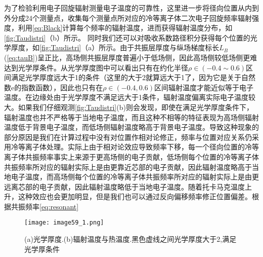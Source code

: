 为了检验利用电子回旋辐射测量电子温度的可靠性，这里进一步将径向位置从内到外分成24个测量点，收集每个测量点所对应的冷等离子体二次电子回旋频率辐射强度，利用\autoref{eq:Black}计算每个频率的辐射温度，进而获得辐射温度分布，如\autoref{fig:Taudistri}（b）所示。
同时我们还可以对吸收系数路径积分获得每个位置的光学厚度，如\autoref{fig:Taudistri}（a）所示。由于共振层厚度与纵场梯度标长$L_B$(\autoref{eq:tauB})呈正比，高场侧共振层厚度普遍小于低场侧，因此高场侧较低场侧更难达到光学厚条件。从光学厚度图中可以看出只有在约化半径$ρ\in(-0.4\sim0.6)$区间满足光学厚度远大于1的条件（这里的大于2就算远大于1了，因为它是关于自然数e的指数函数），因此也只有在$ρ∈(-0.4,0.6)$区间辐射温度才能近似等于电子温度。在边缘处由于光学厚度不满足远大于1条件，辐射温度偏离实际电子温度较大。如果我们仔细观测\autoref{fig:Taudistri}(b)则会发现，即使在满足光学厚度条件下，辐射温度也并不严格等于当地电子温度，而且这种不相等的特征表现为高场侧辐射温度低于背景电子温度，而低场侧辐射温度略高于背景电子温度。导致这种现象的部分原因是我们在计算过程中没有对位置作相对论修正，频率与位置对应关系仍采用冷等离子体处理。实际上由于相对论效应导致频率下移，每一个径向位置的冷等离子体共振频率事实上来源于更高场侧的电子贡献，低场侧每个位置的冷等离子体共振频率所对应的辐射实际上是由更靠近芯部的电子贡献，因此辐射温度略高于当地电子温度，而高场侧每个位置的冷等离子体共振频率所对应的辐射实际上是由更远离芯部的电子贡献，因此辐射温度略低于当地电子温度。随着托卡马克温度上升，这种效应也会更加明显，但是我们也可以通过反向偏移频率修正位置偏差。根据共振频率\autoref{eq:resonant}

\begin{figure}[H]
\centering
\texttt{[image: image59\_1.png]}
\caption{\label{fig:Taudistri} (a)光学厚度.(b)辐射温度与热温度.黑色虚线之间光学厚度大于2,满足光学厚条件}
\end{figure}

